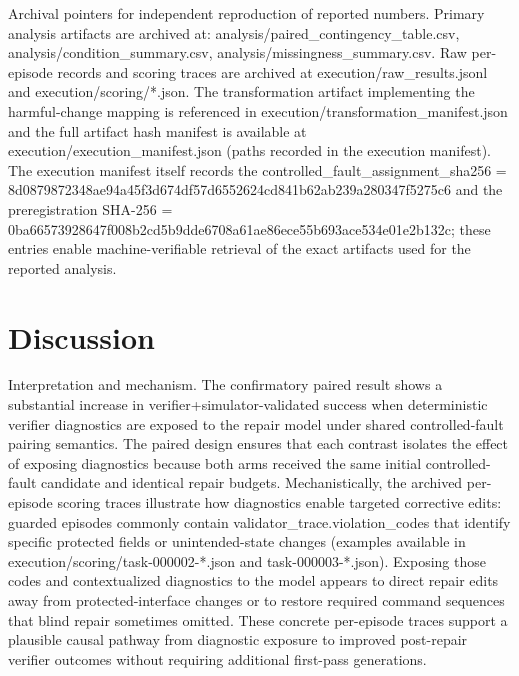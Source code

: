 \documentclass[conference]{IEEEtran}
\begin{document}
Archival pointers for independent reproduction of reported numbers. Primary analysis artifacts are archived at: analysis/paired\_contingency\_table.csv, analysis/condition\_summary.csv, analysis/missingness\_summary.csv. Raw per-episode records and scoring traces are archived at execution/raw\_results.jsonl and execution/scoring/*.json. The transformation artifact implementing the harmful-change mapping is referenced in execution/transformation\_manifest.json and the full artifact hash manifest is available at execution/execution\_manifest.json (paths recorded in the execution manifest). The execution manifest itself records the controlled\_fault\_assignment\_sha256 = 8d087987\allowbreak{}2348ae94\allowbreak{}a45f3d67\allowbreak{}4df57d65\allowbreak{}52624cd8\allowbreak{}41b62ab2\allowbreak{}39a28034\allowbreak{}7f5275c6 and the preregistration SHA-256 = 0ba66573\allowbreak{}928647f0\allowbreak{}08b2cd5b\allowbreak{}9dde6708\allowbreak{}a61ae86e\allowbreak{}ce55b693\allowbreak{}ace534e0\allowbreak{}1e2b132c; these entries enable machine-verifiable retrieval of the exact artifacts used for the reported analysis.

\section{Discussion}
Interpretation and mechanism. The confirmatory paired result shows a substantial increase in verifier+simulator-validated success when deterministic verifier diagnostics are exposed to the repair model under shared controlled-fault pairing semantics. The paired design ensures that each contrast isolates the effect of exposing diagnostics because both arms received the same initial controlled-fault candidate and identical repair budgets. Mechanistically, the archived per-episode scoring traces illustrate how diagnostics enable targeted corrective edits: guarded episodes commonly contain validator\_trace.violation\_codes that identify specific protected fields or unintended-state changes (examples available in execution/scoring/task-000002-*.json and task-000003-*.json). Exposing those codes and contextualized diagnostics to the model appears to direct repair edits away from protected-interface changes or to restore required command sequences that blind repair sometimes omitted. These concrete per-episode traces support a plausible causal pathway from diagnostic exposure to improved post-repair verifier outcomes without requiring additional first-pass generations.
\end{document}
